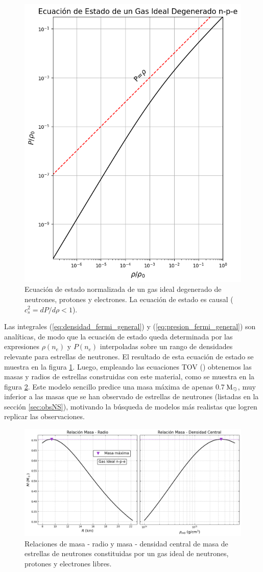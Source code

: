 \begin{figure}[h]
	\centering
	\includegraphics[width=0.55\linewidth]{Figuras/gas_npe}
	\caption[Ecuación de estado de gas ideal degenerado]{Ecuación de estado normalizada de un gas ideal degenerado de neutrones, protones y electrones. La ecuación de estado es causal ($c_s^2 = dP/d\rho < 1$).}
	\label{fig:eosnpe}
\end{figure}

Las integrales (\ref{eq:densidad_fermi_general}) y (\ref{eq:presion_fermi_general}) son analíticas, de modo que la ecuación de estado queda determinada por las expresiones $\rho(n_e)$ y $P(n_e)$ interpoladas sobre un rango de densidades relevante para estrellas de neutrones. El resultado de esta ecuación de estado se muestra en la figura \ref{fig:eosnpe}. Luego, empleando las ecuaciones TOV (\sistemaTOV) obtenemos las masas y radios de estrellas construidas con este material, como se muestra en la figura \ref{fig:mrnpe}. Este modelo sencillo predice una masa máxima de apenas 0.7$\,\text{M}_\odot$, muy inferior a las masas que se han observado de estrellas de neutrones (listadas en la sección \ref{sec:obsNS}), motivando la búsqueda de modelos más realistas que logren replicar las observaciones.

\begin{figure}
	\centering
	\includegraphics[width=0.9\linewidth]{Figuras/gas_npe_MR}
	\caption[Relaciones masa-radio de gas ideal degenerado]{Relaciones de masa - radio y masa - densidad central de masa de estrellas de neutrones constituidas por un gas ideal de neutrones, protones y electrones libres.}
	\label{fig:mrnpe}
\end{figure}



